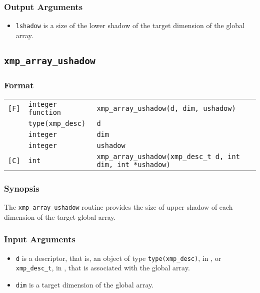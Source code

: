 \subsubsection*{Output Arguments}
\begin{itemize}
 \item {\tt lshadow} is a size of the lower shadow of the target dimension of the global array.
\end{itemize}


\subsection{\tt xmp\_array\_ushadow}

\subsubsection*{Format}

\begin{tabular}{lll}

\verb![F]!& {\tt integer function}& {\tt xmp\_array\_ushadow(d, dim, ushadow)}\\
          & {\tt type(xmp\_desc)} & {\tt d}\\
          & {\tt integer} & {\tt dim}\\
          & {\tt integer} & {\tt ushadow}\\

\verb![C]!&  {\tt int}& {\tt xmp\_array\_ushadow(xmp\_desc\_t d, int dim, int *ushadow)}\\

\end{tabular}

\subsubsection*{Synopsis}

The {\tt xmp\_array\_ushadow} routine provides the size of upper shadow of each dimension of the target global array.


\subsubsection*{Input Arguments}
\begin{itemize}
 \item {\tt d} is a descriptor, that is, an object of type 
       {\tt type(xmp\_desc)}, in {\XMPF}, or {\tt xmp\_desc\_t},
       in {\XMPC}, that is associated with the global array.
 \item {\tt dim} is a target dimension of the global array.
\end{itemize}

